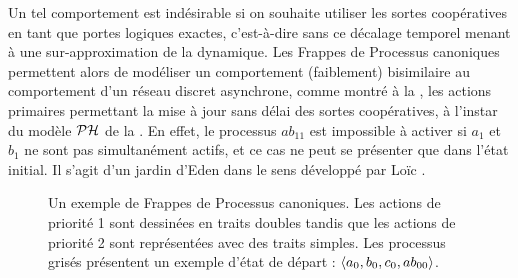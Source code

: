 \begin{example}
  Un tel comportement est indésirable si on souhaite utiliser les sortes coopératives en tant
  que portes logiques exactes, c'est-à-dire sans ce décalage temporel menant à une sur-approximation
  de la dynamique.
  Les Frappes de Processus canoniques permettent alors de modéliser un comportement (faiblement)
  bisimilaire au comportement d'un réseau discret asynchrone,
  comme montré à la ,
  les actions primaires permettant la mise à jour
  sans délai des sortes coopératives, à l'instar du modèle $\mathcal{PH}$ de la .
  En effet, le processus $ab_{11}$ est impossible à activer si $a_1$ et $b_1$ ne sont
  pas simultanément actifs, et ce cas ne peut se présenter que dans l'état initial.
  Il s'agit d'un jardin d'Eden dans le sens développé par
  Loïc \cite[p.~123]{Pauleve11}.
  
  \begin{figure}[ht]
    \centering
    \caption{%
      Un exemple de Frappes de Processus canoniques.
      Les actions de priorité 1 sont dessinées en traits doubles tandis que les actions
      de priorité 2 sont représentées avec des traits simples.
      Les processus grisés présentent un exemple d'état de départ :
      $\mbox{$\langle a_0, b_0, c_0, ab_{00} \rangle$}$.
    }
  \end{figure}
\end{example}


